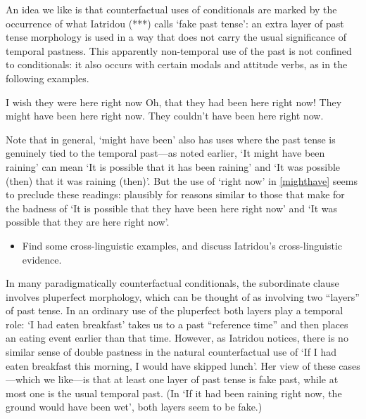 \documentclass[If.tex]{subfiles}
\begin{document}
An idea we like is that counterfactual uses of conditionals are marked by the occurrence of what Iatridou (***) calls ‘fake past tense’: an extra layer of past tense morphology is used in a way that does not carry the usual significance of temporal pastness. This apparently non-temporal use of the past is not confined to conditionals: it also occurs with certain modals and attitude verbs, as in the following examples.
\begin{prop}
	\nitem 
	\begin{prop}
		\aitem
		I wish they were here right now
		\aitem 
		Oh, that they had been here right now!
		\aitem \label{mighthave}
		They might have been here right now.
		\aitem \label{couldhave}
		They couldn't have been here right now.
	\end{prop}
\end{prop}
Note that in general, ‘might have been’ also has uses where the past tense is genuinely tied to the temporal past---as noted earlier, ‘It might have been raining’ can mean ‘It is possible that it has been raining’ and ‘It was possible (then) that it was raining (then)’. But the use of ‘right now’ in \ref{mighthave} seems to preclude these readings: plausibly for reasons similar to those that make for the badness of ‘It is possible that they have been here right now’ and ‘It was possible that they are here right now’.

\begin{itemize} 
	\item
	Find some cross-linguistic examples, and discuss Iatridou's cross-linguistic evidence.
\end{itemize}

In many paradigmatically counterfactual conditionals, the subordinate clause involves pluperfect morphology, which can be thought of as involving two “layers” of past tense. In an ordinary use of the pluperfect both layers play a temporal role: ‘I had eaten breakfast’ takes us to a past “reference time” and then places an eating event earlier than that time. However, as Iatridou notices, there is no similar sense of double pastness in the natural counterfactual use of ‘If I had eaten breakfast this morning, I would have skipped lunch’. Her view of these cases---which we like---is that at least one layer of past tense is fake past, while at most one is the usual temporal past. (In ‘If it had been raining right now, the ground would have been wet’, both layers seem to be fake.)
\end{document}
